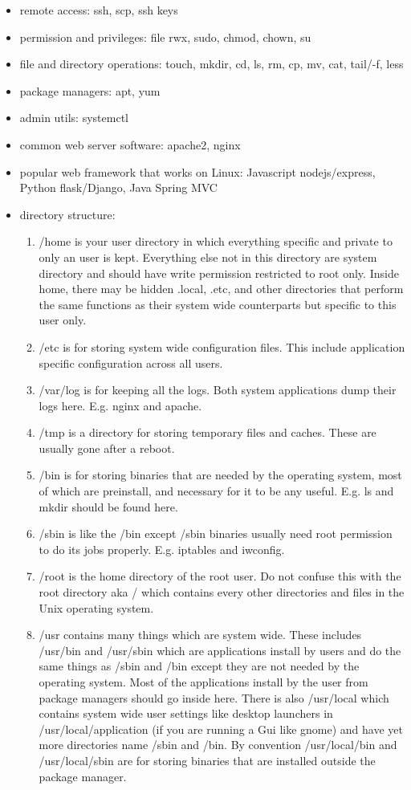 \documentclass[fancy,11pt,titlestyle=display]{style/elegantbook}
\begin{document}
\begin{itemize}
\item remote access: ssh, scp, ssh keys
\item permission and privileges: file rwx, sudo, chmod, chown, su
\item file and directory operations: touch, mkdir, cd, ls, rm, cp, mv, cat, tail/-f, less
\item package managers: apt, yum
\item admin utils: systemctl
\item common web server software: apache2, nginx
\item popular web framework that works on Linux: Javascript nodejs/express, Python flask/Django, Java Spring MVC
\item directory structure:
    \begin{enumerate}
    \item /home is your user directory in which everything specific and private to only an user is kept. Everything else not in this directory are system directory and should have write permission restricted to root only. Inside home, there may be hidden .local, .etc, and other directories that perform the same functions as their system wide counterparts but specific to this user only.
	\item /etc is for storing system wide configuration files. This include application specific configuration across all users. 
	\item /var/log is for keeping all the logs. Both system applications dump their logs here. E.g. nginx and apache. 
	\item /tmp is a directory for storing temporary files and caches. These are usually gone after a reboot.
	\item /bin is for storing binaries that are needed by the operating system, most of which are preinstall, and necessary for it to be any useful. E.g. ls and mkdir should be found here. 
	\item /sbin is like the /bin except /sbin binaries usually need root permission to do its jobs properly. E.g. iptables and iwconfig. 
	\item /root is the home directory of the root user. Do not confuse this with the root directory aka / which contains every other directories and files in the Unix operating system.
	\item /usr contains many things which are system wide. These includes /usr/bin and /usr/sbin which are applications install by users and do the same things as /sbin and /bin except they are not needed by the operating system. Most of the applications install by the user from package managers should go inside here. There is also /usr/local which contains system wide user settings like desktop launchers in /usr/local/application (if you are running a Gui like gnome) and have yet more directories name /sbin and /bin. By convention /usr/local/bin and /usr/local/sbin are for storing binaries that are installed outside the package manager.

\end{enumerate}
\end{itemize}
\end{document}
